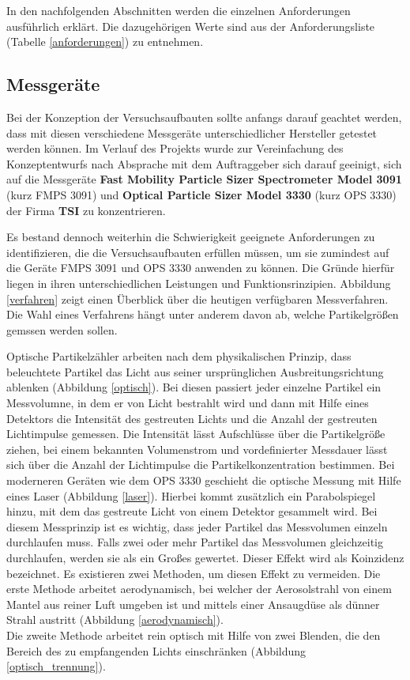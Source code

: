 In den nachfolgenden Abschnitten werden die einzelnen Anforderungen ausf\"{u}hrlich erkl\"{a}rt. Die dazugeh\"{o}rigen Werte sind aus der Anforderungsliste (Tabelle \ref{anforderungen}) zu entnehmen.

\subsection{Messger\"{a}te}
Bei der Konzeption der Versuchsaufbauten sollte anfangs darauf geachtet werden, dass mit diesen verschiedene Messger\"{a}te unterschiedlicher Hersteller getestet werden k\"{o}nnen. Im Verlauf des Projekts wurde zur Vereinfachung des Konzeptentwurfs nach Absprache mit dem Auftraggeber sich darauf geeinigt, sich auf die Messger\"{a}te \textbf{Fast Mobility Particle Sizer Spectrometer Model 3091} (kurz FMPS 3091) und \textbf{Optical Particle Sizer Model 3330} (kurz OPS 3330) der Firma \textbf{TSI} zu konzentrieren. 

Es bestand dennoch weiterhin die Schwierigkeit geeignete Anforderungen zu identifizieren, die die Versuchsaufbauten erf\"{u}llen m\"{u}ssen, um sie zumindest auf die Ger\"{a}te FMPS 3091 und OPS 3330 anwenden zu k\"{o}nnen. Die Gr\"{u}nde hierf\"{u}r liegen in ihren unterschiedlichen Leistungen und Funktionsrinzipien. Abbildung \ref{verfahren} zeigt einen \"{U}berblick \"{u}ber die heutigen verf\"{u}gbaren Messverfahren. Die Wahl eines Verfahrens h\"{a}ngt unter anderem davon ab, welche Partikelgr\"{o}{\ss}en gemssen werden sollen. 

Optische Partikelz\"{a}hler arbeiten nach dem physikalischen Prinzip, dass beleuchtete Partikel das Licht aus seiner urspr\"{u}nglichen Ausbreitungsrichtung ablenken (Abbildung \ref{optisch}). Bei diesen passiert jeder einzelne Partikel ein Messvolumne, in dem er von Licht bestrahlt wird und dann mit Hilfe eines Detektors die Intensit\"{a}t des gestreuten Lichts und die Anzahl der gestreuten Lichtimpulse gemessen. Die Intensit\"{a}t l\"{a}sst Aufschl\"{u}sse \"{u}ber die Partikelgr\"{o}{\ss}e ziehen, bei einem bekannten Volumenstrom und vordefinierter Messdauer l\"{a}sst sich \"{u}ber die Anzahl der Lichtimpulse die Partikelkonzentration bestimmen. Bei moderneren Ger\"{a}ten wie dem OPS 3330 geschieht die optische Messung mit Hilfe eines Laser (Abbildung \ref{laser}). Hierbei kommt zus\"{a}tzlich ein Parabolspiegel hinzu, mit dem das gestreute Licht von einem Detektor gesammelt wird. Bei diesem Messprinzip ist es wichtig, dass jeder Partikel das Messvolumen einzeln durchlaufen muss. Falls zwei oder mehr Partikel das Messvolumen gleichzeitig durchlaufen, werden sie als ein Gro{\ss}es gewertet. Dieser Effekt wird als Koinzidenz bezeichnet. Es existieren zwei Methoden, um diesen Effekt zu vermeiden. Die erste Methode arbeitet aerodynamisch, bei welcher der Aerosolstrahl von einem Mantel aus reiner Luft umgeben ist und mittels einer Ansaugd\"{u}se als d\"{u}nner Strahl austritt (Abbildung \ref{aerodynamisch}).\\
Die zweite Methode arbeitet rein optisch mit Hilfe von zwei Blenden, die den Bereich des zu empfangenden Lichts einschr\"{a}nken (Abbildung \ref{optisch_trennung}).

